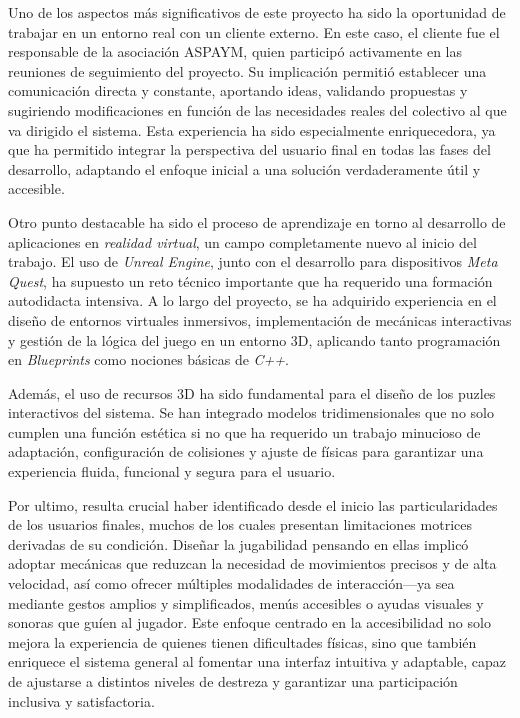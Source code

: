 
Uno de los aspectos más significativos de este proyecto ha sido la oportunidad de trabajar en un entorno real con un cliente externo. En este caso, el cliente fue el responsable de la asociación ASPAYM, quien participó activamente en las reuniones de seguimiento del proyecto. Su implicación permitió establecer una comunicación directa y constante, aportando ideas, validando propuestas y sugiriendo modificaciones en función de las necesidades reales del colectivo al que va dirigido el sistema. Esta experiencia ha sido especialmente enriquecedora, ya que ha permitido integrar la perspectiva del usuario final en todas las fases del desarrollo, adaptando el enfoque inicial a una solución verdaderamente útil y accesible.

Otro punto destacable ha sido el proceso de aprendizaje en torno al desarrollo de aplicaciones en \textit{realidad virtual}, un campo completamente nuevo al inicio del trabajo. El uso de \textit{Unreal Engine}, junto con el desarrollo para dispositivos \textit{Meta Quest}, ha supuesto un reto técnico importante que ha requerido una formación autodidacta intensiva. A lo largo del proyecto, se ha adquirido experiencia en el diseño de entornos virtuales inmersivos, implementación de mecánicas interactivas y gestión de la lógica del juego en un entorno 3D, aplicando tanto programación en \textit{Blueprints} como nociones básicas de \textit{C++}.

Además, el uso de recursos 3D ha sido fundamental para el diseño de los puzles interactivos del sistema. Se han integrado modelos tridimensionales que no solo cumplen una función estética si no que ha requerido un trabajo minucioso de adaptación, configuración de colisiones y ajuste de físicas para garantizar una experiencia fluida, funcional y segura para el usuario.

Por ultimo, resulta crucial haber identificado desde el inicio las particularidades de los usuarios finales, muchos de los cuales presentan limitaciones motrices derivadas de su condición. Diseñar la jugabilidad pensando en ellas implicó adoptar mecánicas que reduzcan la necesidad de movimientos precisos y de alta velocidad, así como ofrecer múltiples modalidades de interacción—ya sea mediante gestos amplios y simplificados, menús accesibles o ayudas visuales y sonoras que guíen al jugador. Este enfoque centrado en la accesibilidad no solo mejora la experiencia de quienes tienen dificultades físicas, sino que también enriquece el sistema general al fomentar una interfaz intuitiva y adaptable, capaz de ajustarse a distintos niveles de destreza y garantizar una participación inclusiva y satisfactoria.